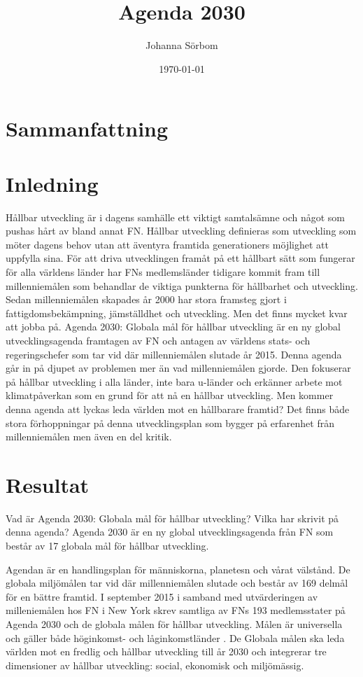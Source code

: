 \documentclass{report}
\title{Agenda 2030}
\date{\today}
\author{Johanna Sörbom}
\begin{document}
\maketitle
\newpage
\tableofcontents
\newpage
\section*{Sammanfattning}
\newpage
\section{Inledning}
Hållbar utveckling är i dagens samhälle ett viktigt samtalsämne och något som pushas hårt av bland annat FN. Hållbar utveckling definieras som utveckling som möter dagens behov utan att äventyra framtida generationers möjlighet att uppfylla sina.\cite{web2030agenda}
För att driva utvecklingen framåt på ett hållbart sätt som fungerar för alla världens länder har FNs medlemsländer tidigare kommit fram till millenniemålen som behandlar de viktiga punkterna för hållbarhet och utveckling.  Sedan millenniemålen skapades år 2000 har stora framsteg gjort i fattigdomsbekämpning, jämställdhet och utveckling. Men det finns mycket kvar att jobba på. \cite{webEuropeanComission}
Agenda 2030: Globala mål för hållbar utveckling är en ny global utvecklingsagenda framtagen av FN och antagen av världens stats- och regeringschefer som tar vid där millenniemålen slutade år 2015. Denna agenda går in på djupet av problemen mer än vad millenniemålen gjorde. Den fokuserar på hållbar utveckling i alla länder, inte bara u-länder och erkänner arbete mot klimatpåverkan som en grund för att nå en hållbar utveckling. Men kommer denna agenda att lyckas leda världen mot en hållbarare framtid? Det finns både stora förhoppningar på denna utvecklingsplan som bygger på erfarenhet från millenniemålen men även en del kritik. 

\section{Resultat}
Vad är Agenda 2030: Globala mål för hållbar utveckling? 
Vilka har skrivit på denna agenda?
Agenda 2030 är en ny global utvecklingsagenda från FN som består av 17 globala mål för hållbar utveckling. \cite{webUNASweden}

Agendan\cite{nam2015transforming} är en handlingsplan för människorna, planetesn och vårat välstånd. De globala miljömålen tar vid där millenniemålen slutade och består av 169 delmål för en bättre framtid. I september 2015 i samband med utvärderingen av milleniemålen hos FN i New York skrev samtliga av FNs 193 medlemsstater på Agenda 2030 och de globala målen för hållbar utveckling. \cite{webUNASweden} Målen är universella och gäller både höginkomst- och låginkomstländer \cite{webUNDP}. De Globala målen ska leda världen mot en fredlig och hållbar utveckling till år 2030 och integrerar tre dimensioner av hållbar utveckling: social, ekonomisk och miljömässig.  \cite{UNA Sweden}
 
\end{document}
